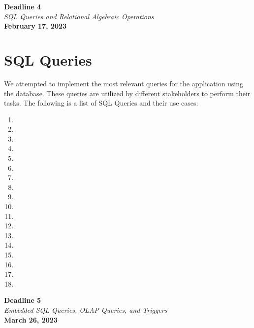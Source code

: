 \documentclass[12pt]{report}
\newcommand{\deadline}[3]{
    \hspace{0pt}
    \vfill
    \begin{center}
        \Huge \textbf{Deadline #1} \\
        \vspace*{5pt}
        \Large \textit{#2} \\
        \vspace*{25pt}
        \large \textbf{#3}
    \end{center}
    \vfill
    \pagebreak
}
\begin{document}
    \pagebreak

    \deadline{4}{SQL Queries and Relational Algebraic Operations}{February 17, 2023}

    \section*{\Huge SQL Queries}
    We attempted to implement the most relevant queries for the application using the database.
    These queries are utilized by different stakeholders to perform their tasks.
    The following is a list of SQL Queries and their use cases:

    \begin{enumerate}
        \item 
        \item 
        \item 
        \item 
        \item 
        \item 
        \item 
        \item 
        \item 
        \item 
        \item 
        \item 
        \item 
        \item 
        \item 
        \item 
        \item 
        \item 
    \end{enumerate}

    \pagebreak

    \deadline{5}{Embedded SQL Queries, OLAP Queries, and Triggers}{March 26, 2023}
\end{document}
